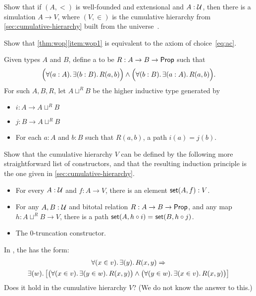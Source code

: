 \begin{ex}
  Show that if $(A,<)$ is well-founded and extensional and $A:\mathcal{U}$, then there is a simulation $A\to V$, where $(V,\in)$ is the cumulative hierarchy from \autoref{sec:cumulative-hierarchy} built from the universe~\UU.
\end{ex}

\begin{ex}\label{ex:choice-function}
  Show that \autoref{thm:wop}\ref{item:wop1} is equivalent to the axiom of choice~\eqref{eq:ac}.
\end{ex}

\begin{ex}\label{ex:cumhierhit}
  Given types $A$ and $B$, define a 
  to be $R:A\to B\to \mathsf{Prop}$ such that
  \[ \Big(\fall{a:A}\exis{b:B} R(a,b) \Big) \land \Big(\fall{b:B}\exis{a:A} R(a,b) \Big). \]
  For such $A,B,R$, let $A\sqcup^R B$ be the higher inductive type generated by
  \begin{itemize}
  \item $i:A\to A\sqcup^R B$
  \item $j:B\to A\sqcup^R B$
  \item For each $a:A$ and $b:B$ such that $R(a,b)$, a path $i(a)=j(b)$.
  \end{itemize}
  Show that the cumulative hierarchy $V$ can be defined by the following more straightforward list of constructors, and that the resulting induction principle is the one given in \autoref{sec:cumulative-hierarchy}.
  \begin{itemize}
  \item For every $A : \mathcal{U}$ and $f : A \to V$, there is an element $\mathsf{set}(A, f) : V$.
  \item For any $A,B:\mathcal{U}$ and bitotal relation
    $R:A\to B\to \mathsf{Prop}$, and any map $h:A\sqcup^R B \to V$, there is a path $\mathsf{set}(A,h\circ i) =_{} \mathsf{set}(B,h\circ j)$.
  \item The 0-truncation constructor.
  \end{itemize}
\end{ex}

\begin{ex}
  In \CZF, the 
  has the form:
   \begin{multline*}
   \fall{x\in v}\exis{y} R(x,y) \Rightarrow \\
   \exis{w}\big[\big(\fall{x\in v}\exis{y\in w}R(x,y)\big)\land \big(\fall{y\in w}\exis{x\in v}R(x,y) \big)\big]
   \end{multline*}
   Does it hold in the cumulative hierarchy $V$?  (We do not know the answer to this.)
\end{ex}

